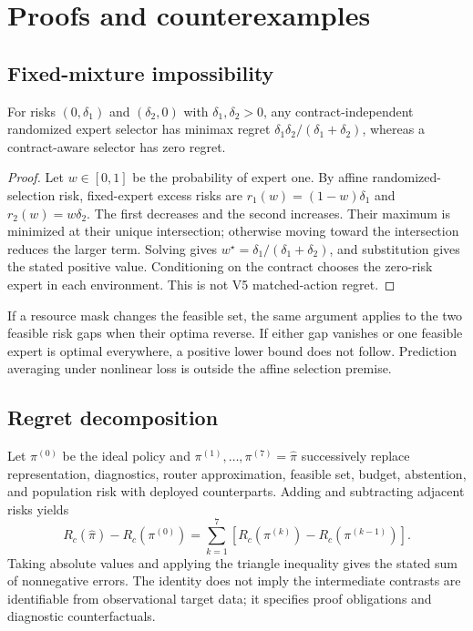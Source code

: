 \section{Proofs and counterexamples}

\subsection{Fixed-mixture impossibility}
\begin{theorem}
For risks \((0,\delta_1)\) and \((\delta_2,0)\) with \(\delta_1,\delta_2>0\), any contract-independent randomized expert selector has minimax regret \(\delta_1\delta_2/(\delta_1+\delta_2)\), whereas a contract-aware selector has zero regret.
\end{theorem}
\begin{proof}
Let \(w\in[0,1]\) be the probability of expert one. By affine randomized-selection risk, fixed-expert excess risks are \(r_1(w)=(1-w)\delta_1\) and \(r_2(w)=w\delta_2\). The first decreases and the second increases. Their maximum is minimized at their unique intersection; otherwise moving toward the intersection reduces the larger term. Solving gives \(w^\star=\delta_1/(\delta_1+\delta_2)\), and substitution gives the stated positive value. Conditioning on the contract chooses the zero-risk expert in each environment. This is not V5 matched-action regret.
\end{proof}
If a resource mask changes the feasible set, the same argument applies to the two feasible risk gaps when their optima reverse. If either gap vanishes or one feasible expert is optimal everywhere, a positive lower bound does not follow. Prediction averaging under nonlinear loss is outside the affine selection premise.

\subsection{Regret decomposition}
Let \(\pi^{(0)}\) be the ideal policy and \(\pi^{(1)},\ldots,\pi^{(7)}=\hat\pi\) successively replace representation, diagnostics, router approximation, feasible set, budget, abstention, and population risk with deployed counterparts. Adding and subtracting adjacent risks yields
\[
R_c(\hat\pi)-R_c(\pi^{(0)})=\sum_{k=1}^{7}\left[R_c(\pi^{(k)})-R_c(\pi^{(k-1)})\right].
\]
Taking absolute values and applying the triangle inequality gives the stated sum of nonnegative errors. The identity does not imply the intermediate contrasts are identifiable from observational target data; it specifies proof obligations and diagnostic counterfactuals.


